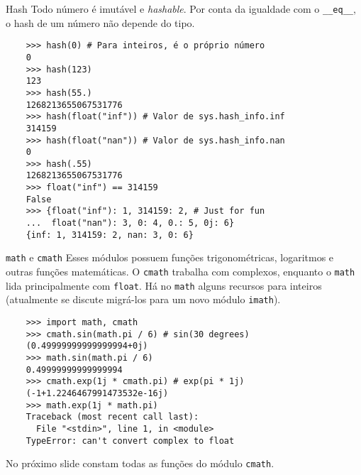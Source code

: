 \documentclass[utf8]{beamer}
\begin{document}
\begin{frame}[fragile]{Hash}
  Todo número é imutável e \emph{hashable}.
  Por conta da igualdade com o \texttt{__eq__},
  o hash de um número não depende do tipo.

  \begin{verbatim}
    >>> hash(0) # Para inteiros, é o próprio número
    0
    >>> hash(123)
    123
    >>> hash(55.)
    1268213655067531776
    >>> hash(float("inf")) # Valor de sys.hash_info.inf
    314159
    >>> hash(float("nan")) # Valor de sys.hash_info.nan
    0
    >>> hash(.55)
    1268213655067531776
    >>> float("inf") == 314159
    False
    >>> {float("inf"): 1, 314159: 2, # Just for fun
    ...  float("nan"): 3, 0: 4, 0.: 5, 0j: 6}
    {inf: 1, 314159: 2, nan: 3, 0: 6}
  \end{verbatim}

\end{frame}


\begin{frame}[fragile]{\texttt{math} e \texttt{cmath}}
  Esses módulos possuem funções trigonométricas, logaritmos
  e outras funções matemáticas.
  O \texttt{cmath} trabalha com complexos, enquanto o
  \texttt{math} lida principalmente com
  \texttt{float}.
  Há no \texttt{math} alguns recursos para inteiros
  (atualmente se discute migrá-los para um novo módulo
  \texttt{imath}).

  \begin{verbatim}
    >>> import math, cmath
    >>> cmath.sin(math.pi / 6) # sin(30 degrees)
    (0.49999999999999994+0j)
    >>> math.sin(math.pi / 6)
    0.49999999999999994
    >>> cmath.exp(1j * cmath.pi) # exp(pi * 1j)
    (-1+1.2246467991473532e-16j)
    >>> math.exp(1j * math.pi)
    Traceback (most recent call last):
      File "<stdin>", line 1, in <module>
    TypeError: can't convert complex to float
  \end{verbatim}

  No próximo slide constam todas as funções do
  módulo \texttt{cmath}.

\end{frame}
\end{document}
